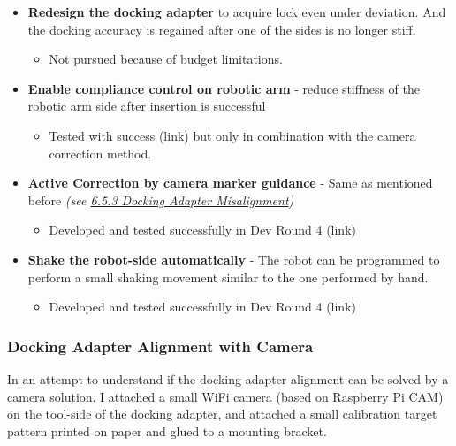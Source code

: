 \documentclass[11pt]{book}
\begin{document}
\begin{itemize}
	\item \textbf{Redesign the docking adapter} to acquire lock even under deviation. And the docking accuracy is regained after one of the sides is no longer stiff.

\begin{itemize}
	\item Not pursued because of budget limitations.

\end{itemize}
	\item \textbf{Enable compliance control on robotic arm }- reduce stiffness of the robotic arm side after insertion is successful

\begin{itemize}
	\item Tested with success (link) but only in combination with the camera correction method.

\end{itemize}
	\item \textbf{Active Correction by camera marker guidance} - Same as mentioned before \textit{\textcolor[HTML]{B7B7B7}{(see \uline{6.5.3 Docking Adapter Misalignment})}}

\begin{itemize}
	\item Developed and tested successfully in Dev Round 4 (link)

\end{itemize}
	\item \textbf{Shake the robot-side automatically} - The robot can be programmed to perform a small shaking movement similar to the one performed by hand.

\begin{itemize}
	\item Developed and tested successfully in Dev Round 4 (link)

\end{itemize}
\end{itemize}
\subsubsection{Docking Adapter Alignment with Camera}

In an attempt to understand if the docking adapter alignment can be solved by a camera solution. I attached a small WiFi camera (based on Raspberry Pi CAM) on the tool-side of the docking adapter, and attached a small calibration target pattern printed on paper and glued to a mounting bracket.
\end{document}
